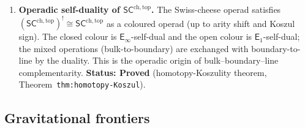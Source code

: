 \documentclass[11pt]{article}
\newcommand{\Eone}{\mathsf{E}_1}
\newcommand{\Einf}{\mathsf{E}_{\infty}}
\newcommand{\SCchtop}{\mathsf{SC}^{\mathrm{ch,top}}}
\begin{document}
\begin{enumerate}[label=\textbf{A\arabic*.},leftmargin=2.5em]
\item \textbf{Operadic self-duality of $\SCchtop$.}
The Swiss-cheese operad satisfies $(\SCchtop)^! \cong \SCchtop$ as a
coloured operad (up to arity shift and Koszul sign).
The closed colour is $\Einf$-self-dual and the open colour is
$\Eone$-self-dual; the mixed operations (bulk-to-boundary) are
exchanged with boundary-to-line by the duality.
This is the operadic origin of bulk--boundary--line complementarity.
\textbf{Status: Proved} (homotopy-Koszulity theorem,
Theorem~\texttt{thm:homotopy-Koszul}).

\end{enumerate}

\subsection{Gravitational frontiers}
\label{ssec:grav-frontiers}
\end{document}

